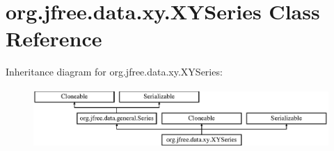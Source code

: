 \hypertarget{classorg_1_1jfree_1_1data_1_1xy_1_1_x_y_series}{}\section{org.\+jfree.\+data.\+xy.\+X\+Y\+Series Class Reference}
\label{classorg_1_1jfree_1_1data_1_1xy_1_1_x_y_series}
Inheritance diagram for org.\+jfree.\+data.\+xy.\+X\+Y\+Series\+:\begin{figure}[H]
\begin{center}
\leavevmode
\includegraphics[height=2.282609cm]{classorg_1_1jfree_1_1data_1_1xy_1_1_x_y_series}
\end{center}
\end{figure}
